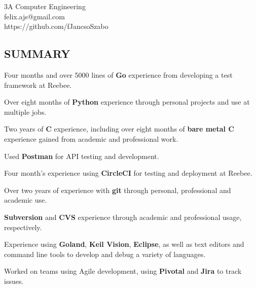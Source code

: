 \documentclass[margin,line]{resume}
\begin{document}
{
    \hfill 3A Computer Engineering \vspace{0mm} \\\vspace{0mm}
    \hfill felix.ajs@gmail.com       \vspace{0mm}\\\vspace{0mm}
    \hfill https://github.com/fJancsoSzabo \vspace{0mm}\\\vspace{-9mm}
}

\begin{resume}

    \section{\mysidestyle \textbf{\large{S}\small{UMMARY}}}

    \begin{tightemizenoindent}
    \item Four months and over 5000 lines of \textbf{Go} experience from developing a test framework at Reebee.
    \item Over eight months of \textbf{Python} experience through personal projects and use at multiple jobs.
    \item Two years of \textbf{C} experience, including over eight months of \textbf{bare metal C} experience gained from academic and professional work.
    \item Used \textbf{Postman} for API testing and development.
    \item Four month's experience using \textbf{CircleCI} for testing and deployment at Reebee.
    \item Over two years of experience with \textbf{git} through personal, professional and academic use.
    \item \textbf{Subversion} and \textbf{CVS} experience through academic and professional usage, respectively.
    \item Experience using \textbf{Goland}, \textbf{Keil \pmb{\si\micro}Vision}, \textbf{Eclipse}, as well as text editors and command line tools to develop and debug a variety of languages.
    \item Worked on teams using Agile development, using \textbf{Pivotal} and \textbf{Jira} to track issues.
    \end{tightemizenoindent}


\end{resume}
\end{document}
